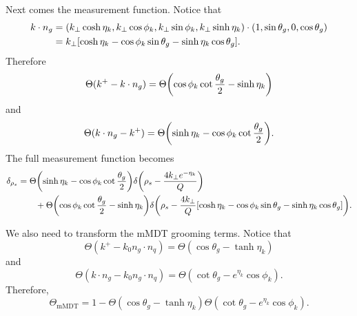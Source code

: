 \documentclass[../thesis.tex]{subfiles}
\providecommand{\mMDT}{\mathrm{mMDT}}
\begin{document}
	Next comes the measurement function. Notice that
	\begin{equation}
	\begin{aligned}
		k \cdot n_g &= \qty(k_\perp \cosh\eta_k, k_\perp \cos\phi_k, k_\perp \sin\phi_k, k_\perp \sinh\eta_k) \cdot(1, \sin\theta_g, 0, \cos\theta_g) \\
		&= k_\perp \qty[\cosh\eta_k - \cos\phi_k \sin\theta_g - \sinh\eta_k \cos\theta_g].
	\end{aligned}
	\end{equation}
	Therefore
	\begin{equation}
		\Theta(k^+ - k \cdot n_g) = \Theta\qty(\cos\phi_k \cot\frac{\theta_g}{2} - \sinh\eta_k)
	\end{equation}
	and
	\begin{equation}
		\Theta(k \cdot n_g - k^+) = \Theta\qty(\sinh\eta_k - \cos\phi_k \cot\frac{\theta_g}{2}).
	\end{equation}
	The full measurement function becomes
	\begin{equation}\label{all-eq:measurement function specific coords}
	\begin{aligned}
		\delta_{\rho_s} &= \Theta\qty(\sinh\eta_k - \cos\phi_k \cot\frac{\theta_g}{2}) \delta\qty(\rho_s - \frac{4k_\perp e^{-\eta_k}}{Q}) \\
		&\qquad+ \Theta\qty(\cos\phi_k \cot\frac{\theta_g}{2} - \sinh\eta_k) \delta\qty(\rho_s - \frac{4k_\perp}{Q}\qty[\cosh\eta_k - \cos\phi_k \sin\theta_g - \sinh\eta_k \cos\theta_g]).
	\end{aligned}
	\end{equation}

	We also need to transform the mMDT grooming terms. Notice that
	\begin{equation}
		\Theta(k^+ - k_0 n_g \cdot n_q) = \Theta(\cos\theta_g - \tanh \eta_k)
	\end{equation}
	and
	\begin{equation}
		\Theta(k \cdot n_g - k_0 n_g \cdot n_q) = \Theta(\cot\theta_g - e^{\eta_k}\cos\phi_k).
	\end{equation}
	Therefore,
	\begin{equation}\label{all-eq:mMDT grooming specific coords}
		\Theta_{\mMDT} = 1 - \Theta(\cos\theta_g - \tanh \eta_k)\Theta(\cot\theta_g - e^{\eta_k}\cos\phi_k).
	\end{equation}
\end{document}
